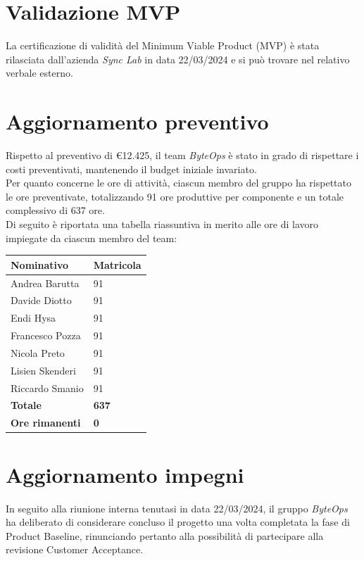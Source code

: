 \documentclass{article}
\begin{document}
\section{Validazione MVP}

La certificazione di validità del Minimum Viable Product (MVP) è stata rilasciata dall'azienda \textit{Sync Lab} in data 22/03/2024 e si può trovare nel relativo verbale esterno.

\section{Aggiornamento preventivo}
Rispetto al preventivo di €12.425, il team \textit{ByteOps} è stato in grado di rispettare i costi preventivati, mantenendo il budget iniziale invariato. \\
Per quanto concerne le ore di attività, ciascun membro del gruppo ha rispettato le ore preventivate, totalizzando 91 ore produttive per componente e un totale complessivo di 637 ore.\\
Di seguito è riportata una tabella riassuntiva in merito alle ore di lavoro impiegate da ciascun membro del team:
\begin{center}
    \begin{tabular}{|C{4cm}|C{2cm}|}
    \hline
        \textbf{Nominativo} & \textbf{Matricola} \\
        \hline\hline
        Andrea Barutta  & 91 \\
        \hline
        Davide Diotto   & 91 \\ 
        \hline
        Endi Hysa       & 91 \\ 
        \hline
        Francesco Pozza & 91 \\ 
        \hline
        Nicola Preto    & 91 \\ 
        \hline
        Lisien Skenderi & 91 \\ 
        \hline
        Riccardo Smanio & 91 \\ 
        \hline\hline
        \textbf{Totale} & \textbf{637} \\ 
        \hline
        \textbf{Ore rimanenti} & \textbf{0} \\
        \hline
    \end{tabular}
\end{center}

\section{Aggiornamento impegni}
In seguito alla riunione interna tenutasi in data 22/03/2024, il gruppo \textit{ByteOps} ha deliberato di considerare concluso il progetto una volta completata la fase di Product Baseline, rinunciando pertanto alla possibilità di partecipare alla revisione Customer Acceptance.
\end{document}
